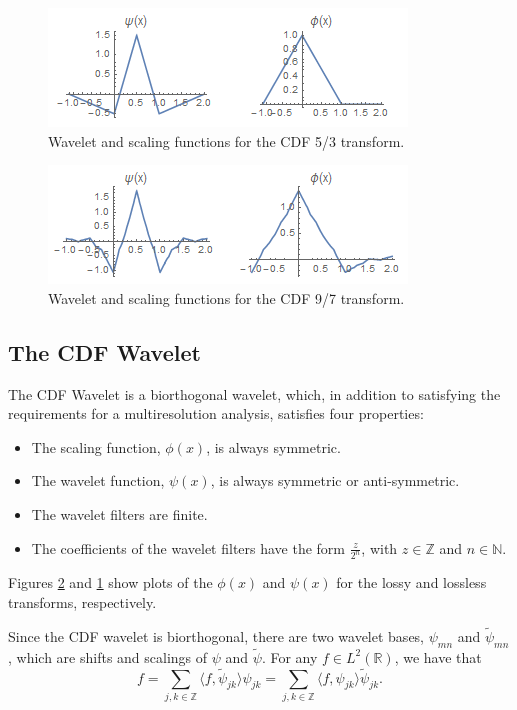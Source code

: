 \documentclass[12pt]{article}
\begin{document}
\begin{figure}[h]
	\centering
	\includegraphics[scale=0.9]{resources/lossless_family.png}
	\caption{Wavelet and scaling functions for the CDF 5/3 transform.}
	\label{fig:lossless_family}
\end{figure}

\begin{figure}[h]
	\centering
	\includegraphics[scale=0.9]{resources/lossy_family.png}
	\caption{Wavelet and scaling functions for the CDF 9/7 transform.}
	\label{fig:lossy_family}
\end{figure}

\subsection{The CDF Wavelet}

The CDF Wavelet is a biorthogonal wavelet, which, in addition to satisfying the requirements for a multiresolution analysis,
satisfies four properties\cite{old}:
\begin{itemize}
	\item The scaling function, $\phi(x)$, is always symmetric.
	\item The wavelet function, $\psi(x)$, is always symmetric or anti-symmetric.
	\item The wavelet filters are finite.
	\item The coefficients of the wavelet filters have the form $\frac{z}{2^n}$, with $z\in\mathbb{Z}$ and $n\in\mathbb{N}$.
\end{itemize}
Figures \ref{fig:lossy_family} and \ref{fig:lossless_family} show plots of the $\phi(x)$
and $\psi(x)$ for the lossy and lossless transforms, respectively.

Since the CDF wavelet is biorthogonal, there are two wavelet bases, $\psi_{mn}$ and $\tilde{\psi}_{mn}$,
which are shifts and scalings of $\psi$ and $\tilde{\psi}$.\cite{cdf}
For any $f\in L^2(\mathbb{R})$, we have that
\begin{equation}
	f = \sum_{j,k\in\mathbb{Z}}\langle f,\tilde{\psi}_{jk}\rangle\psi_{jk}=\sum_{j,k\in\mathbb{Z}}\langle f,\psi_{jk}\rangle\tilde{\psi}_{jk}.
\end{equation}
\end{document}
